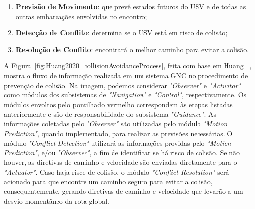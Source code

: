         \begin{enumerate}
            \item \textbf{Previsão de Movimento}: que prevê estados futuros do USV e de todas as outras embarcações envolvidas no encontro;
            \item \textbf{Detecção de Conflito}: determina se o USV está em risco de colisão;
            \item \textbf{Resolução de Conflito}: encontrará o melhor caminho para evitar a colisão.
        \end{enumerate}
        
        A Figura~\ref{fig:Huang2020_collisionAvoidanceProcess}, feita com base em Huang \etal~\cite{Huang2020Ship}, mostra o fluxo de informação realizada em um sistema GNC no procedimento de prevenção de colisão. Na imagem, podemos considerar \textit{"Observer"} e \textit{"Actuator"} como módulos dos subsistemas de \textit{"Navigation"} e \textit{"Control"}, respectivamente. Os módulos envoltos pelo pontilhado vermelho correspondem às etapas listadas anteriormente e são de responsabilidade do subsistema \textit{"Guidance"}. As informações coletadas pelo \textit{"Observer"} são utilizadas pelo módulo \textit{"Motion Prediction"}, quando implementado, para realizar as previsões necessárias. O módulo \textit{"Conflict Detection"} utilizará as informações providas pelo \textit{"Motion Prediction"}, e/ou \textit{"Observer"}, a fim de identificar se há risco de colisão. Se não houver, as diretivas de caminho e velocidade são enviadas diretamente para o \textit{"Actuator"}. Caso haja risco de colisão, o módulo \textit{"Conflict Resolution"} será acionado para que encontre um caminho seguro para evitar a colisão, consequentemente, gerando diretivas de caminho e velocidade que levarão a um desvio momentâneo da rota global.
        
